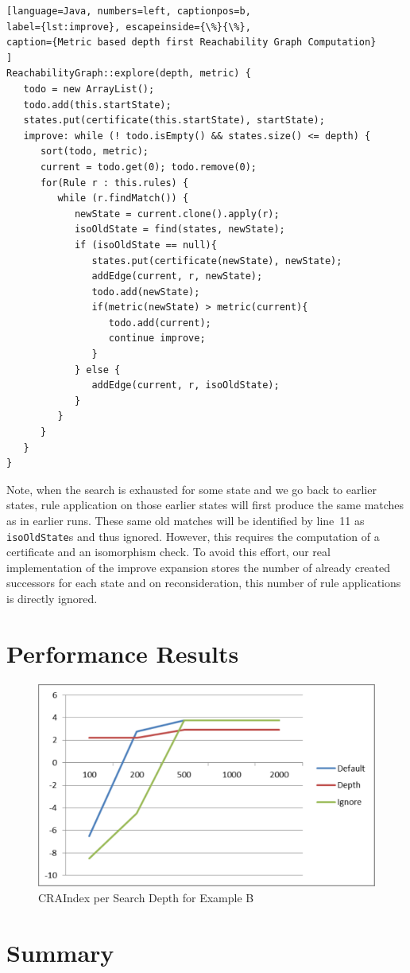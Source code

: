 \documentclass[submission,copyright,creativecommons]{eptcs}
\begin{document}
\begin{lstlisting}[language=Java, numbers=left, captionpos=b, 
label={lst:improve}, escapeinside={\%}{\%},
caption={Metric based depth first Reachability Graph Computation}
]
ReachabilityGraph::explore(depth, metric) {
   todo = new ArrayList();
   todo.add(this.startState);
   states.put(certificate(this.startState), startState);
   improve: while (! todo.isEmpty() && states.size() <= depth) {
      sort(todo, metric);
      current = todo.get(0); todo.remove(0);
      for(Rule r : this.rules) {
         while (r.findMatch()) {
            newState = current.clone().apply(r);
            isoOldState = find(states, newState);
            if (isoOldState == null){
               states.put(certificate(newState), newState);
               addEdge(current, r, newState);
               todo.add(newState);
               if(metric(newState) > metric(current){
                  todo.add(current);
                  continue improve;
               }
            } else {
               addEdge(current, r, isoOldState);
            }
         }
      }
   }
}
\end{lstlisting}

Note, when the search is exhausted for some state and we go back to earlier
states, rule application on those earlier states will first produce the same
matches as in earlier runs. These same old matches will be identified by line~11
as \texttt{isoOldState}s and thus ignored. However, this requires the computation 
of a certificate and an isomorphism check. To avoid this effort, our real 
implementation of the improve expansion stores the number of already created successors
for each state and on reconsideration, this number of rule applications is directly 
ignored.  

\section{Performance Results}
\label{sec:results}

\begin{figure}[ht] \centering
	\includegraphics[width=\linewidth]{images/CRAByDepthB.pdf}
 \caption{CRAIndex per Search Depth for Example B}
 \label{fig:CRAByDepthB}
\end{figure}


\section{Summary}
\label{sec:summary}

 


  
\end{document}
